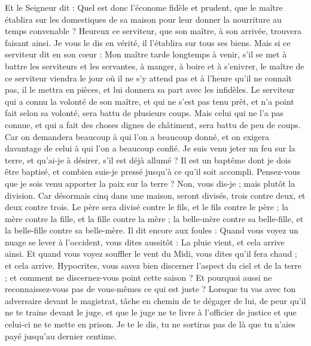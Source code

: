 \begin{multicols}{2}
{Et le Seigneur dit : Quel est donc l’économe fidèle et prudent, que le maître établira sur les domestiques de sa maison pour leur donner la nourriture au temps convenable ?
Heureux ce serviteur, que son maître, à son arrivée, trouvera faisant ainsi.
Je vous le dis en vérité, il l'établira sur tous ses biens.
Mais si ce serviteur dit en son cœur : Mon maître tarde longtemps à venir, s’il se met à battre les serviteurs et les servantes, à manger, à boire et à s'enivrer,
le maître de ce serviteur viendra le jour où il ne s’y attend pas et à l'heure qu'il ne connaît pas, il le mettra en pièces, et lui donnera sa part avec les infidèles.
Le serviteur qui a connu la volonté de son maître, et qui ne s'est pas tenu prêt, et n'a point fait selon sa volonté, sera battu de plusieurs coups.
Mais celui qui ne l'a pas connue, et qui a fait des choses dignes de châtiment, sera battu de peu de coups. Car on demandera beaucoup à qui l’on a beaucoup donné, et on exigera davantage de celui à qui l’on a beaucoup confié.
Je suis venu jeter un feu sur la terre, et qu’ai-je à désirer, s'il est déjà allumé ?
Il est un baptême dont je dois être baptisé, et combien suis-je pressé jusqu'à ce qu'il soit accompli.
Pensez-vous que je sois venu apporter la paix sur la terre ? Non, vous dis-je ; mais plutôt la division.
Car désormais cinq dans une maison, seront divisés, trois contre deux, et deux contre trois.
Le père sera divisé contre le fils, et le fils contre le père ; la mère contre la fille, et la fille contre la mère ; la belle-mère contre sa belle-fille, et la belle-fille contre sa belle-mère.
Il dit encore aux foules : Quand vous voyez un nuage se lever à l'occident, vous dites aussitôt : La pluie vient, et cela arrive ainsi.
Et quand vous voyez souffler le vent du Midi, vous dites qu'il fera chaud ; et cela arrive.
Hypocrites, vous savez bien discerner l’aspect du ciel et de la terre ; et comment ne discernez-vous point cette saison ?
Et pourquoi aussi ne reconnaissez-vous pas de vous-mêmes ce qui est juste ?
\TextTitle{[La réconciliation]}
Lorsque tu vas avec ton adversaire devant le magistrat, tâche en chemin de te dégager de lui, de peur qu’il ne te traine devant le juge, et que le juge ne te livre à l’officier de justice et que celui-ci ne te mette en prison.
Je te le dis, tu ne sortiras pas de là que tu n’aies payé jusqu’au dernier centime.
}
\end{multicols}

